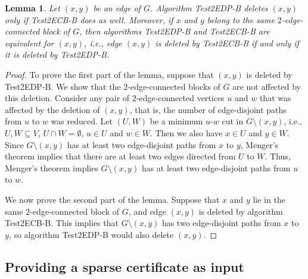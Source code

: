\documentclass[11pt]{article}
\newtheorem{lemma}[theorem]{Lemma}
\begin{document}
\begin{lemma}
\label{lemma:Test2EDP-Test2ECB}
Let $(x,y)$ be an edge of $G$. Algorithm \textsf{Test2EDP-B} deletes $(x,y)$ only if \textsf{Test2ECB-B} does as well.
Moreover, if  $x$ and $y$ belong to the same $2$-edge-connected block of $G$, then algorithms \textsf{Test2EDP-B} and \textsf{Test2ECB-B} are equivalent for $(x,y)$,
i.e., edge $(x,y)$ is deleted by \textsf{Test2ECB-B} if and only if it is deleted by \textsf{Test2EDP-B}.
\end{lemma}
\begin{proof}
To prove the first part of the lemma, suppose that $(x,y)$ is deleted by \textsf{Test2EDP-B}. We show that the $2$-edge-connected blocks of $G$ are not affected by this deletion.
Consider any pair of $2$-edge-connected vertices $u$ and $w$ that was affected by the deletion of $(x,y)$, that is, the number of edge-disjoint paths from $u$ to $w$ was reduced.
Let $(U,W)$ be a minimum $u$-$w$ cut in $G\setminus (x,y)$, i.e., $U, W \subseteq V$, $U \cap W = \emptyset$, $u \in U$ and $w \in W$.
Then we also have $x \in U$ and $y \in W$. Since $G\setminus (x,y)$  has at least two edge-disjoint paths from $x$ to $y$, Menger's theorem implies that there are at least two edges directed from $U$ to $W$.
Thus, Menger's theorem implies $G\setminus (x,y)$  has at least two edge-disjoint paths from $u$ to $w$.

We now prove the second part of the lemma. Suppose that $x$ and $y$ lie in the same $2$-edge-connected block of $G$, and edge $(x,y)$ is deleted by algorithm \textsf{Test2ECB-B}.
This implies that $G\setminus (x,y)$ has two edge-disjoint paths from $x$ to $y$, so algorithm \textsf{Test2EDP-B} would also delete $(x,y)$.
\end{proof}

\subsection{Providing a sparse certificate as input}
\label{sec:sparse-input}
\end{document}
